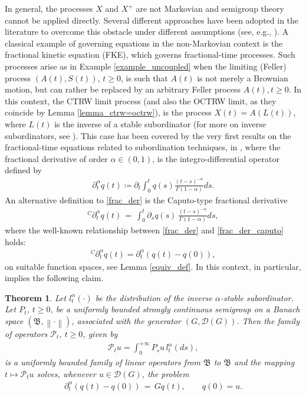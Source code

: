 \documentclass[reqno]{amsart}
\newtheorem{theorem}{Theorem}[section] %
\theoremstyle{remark}
\numberwithin{equation}{section} %
\newcommand{\1}{\mathds{1}}
\begin{document}
	In general, the processes $X$ and $X^+$ are not Markovian and semigroup theory cannot be applied directly. Several different approaches have been adopted in the literature to overcome this obstacle under different assumptions (see, e.g., \cite{ascione2021time, Baeumer2001, mirko, chen, hernandez2017, kochubei, kolokoltsov2015, mainardi2000fractional,  meerschaert2002governing, savtoa, ScalasGorenfloMainardi2004, STRAKA2018451, toaldo_pota, toaldo2015, Ton19jmaa}). A classical example of governing equations in the non-Markovian context is the fractional kinetic equation (FKE), which governs fractional-time processes. Such processes arise as in Example \ref{example_uncoupled} when the limiting (Feller) process $(A(t), S(t))$, $t \geq 0$, is such that $A(t)$ is not merely a Brownian motion, but can rather be replaced by an arbitrary Feller process $A(t), t \geq 0$. In this context, the CTRW limit process (and also the OCTRW limit, as they coincide by Lemma \ref{lemma_ctrw=octrw}), is the process $X(t) = A(L(t))$, where $L(t)$ is the inverse of a stable subordinator (for more on inverse subordinators, see \cite{bertoin1999, tlms}). This case has been covered by the very first results on the fractional-time equations related to subordination techniques, in \cite{bazlekova, Baeumer2001}, where the fractional derivative of order $\alpha \in (0,1)$, is the integro-differential operator defined by
	\begin{align}
		\partial_t^\alpha q(t) \coloneqq \partial_t \int_0^t q(s) \frac{(t-s)^{-\alpha}}{\Gamma (1-\alpha)} ds.
		\label{frac_der}
	\end{align}
	An alternative definition to \eqref{frac_der} is the Caputo-type fractional derivative
	\begin{align}
		^C\partial_t^\alpha q(t) \, = \, \int_0^t \partial_sq(s) \, \frac{(t-s)^{-\alpha}}{\Gamma(1-\alpha)} ds,
		\label{frac_der_caputo}
	\end{align}
	where the well-known relationship between   \eqref{frac_der} and \eqref{frac_der_caputo} holds:
	\begin{align}
		^C\partial_t^\alpha q(t) = \partial_t^\alpha (q(t) - q(0)),
	\end{align}
	on suitable function spaces, see Lemma \ref{equiv_def}.
	In this context, in particular, \cite[Theorem 3.1]{Baeumer2001} implies the following claim.
	\begin{theorem}
		Let $l_t^\alpha (\cdot)$ be the distribution of the inverse $\alpha$-stable subordinator.  Let $P_t$, $t \geq 0$, be a uniformly bounded strongly continuous semigroup on a Banach space $(\mathfrak{B}, \left\| \cdot \right\|)$, associated with the generator $(G, \mathcal{D}(G))$. Then the family of operators $\mathcal{P}_t$, $t \geq 0$, given by
		\begin{align}
			\mathcal{P}_t u = \int_0^{+\infty} P_s u \, l_t^\alpha(ds),
		\end{align}
		is a uniformly bounded family of linear operators from $\mathfrak{B}$ to $\mathfrak{B}$ and the mapping $t \mapsto \mathcal{P}_tu$ solves, whenever $u \in \mathcal{D}(G)$, the problem
		\begin{align}
			\partial_t^\alpha (q(t)-q(0))\, = \, G q(t), \qquad q(0)  = u.
		\end{align}
	\end{theorem}
\end{document}

